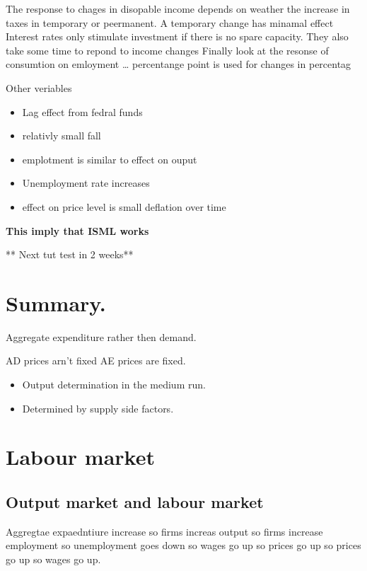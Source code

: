 \documentclass[twocolumn]{article}
\providecommand{\tightlist}{%
  \setlength{\itemsep}{0pt}\setlength{\parskip}{0pt}}
\begin{document}
The response to chages in disopable income depends on weather the
increase in taxes in temporary or peermanent. A temporary change has
minamal effect Interest rates only stimulate investment if there is no
spare capacity. They also take some time to repond to income changes
Finally look at the resonse of consumtion on emloyment \ldots{}
percentange point is used for changes in percentag

Other veriables

\begin{itemize}
\tightlist
\item
  Lag effect from fedral funds
\item
  relativly small fall
\item
  emplotment is similar to effect on ouput
\item
  Unemployment rate increases
\item
  effect on price level is small deflation over time
\end{itemize}

\textbf{This imply that ISML works}

** Next tut test in 2 weeks**

\hypertarget{summary.}{%
\section{Summary.}\label{summary.}}

Aggregate expenditure rather then demand.

AD prices arn't fixed AE prices are fixed.

\begin{itemize}
\tightlist
\item
  Output determination in the medium run.
\item
  Determined by supply side factors.
\end{itemize}

\hypertarget{labour-market}{%
\section{Labour market}\label{labour-market}}

\hypertarget{output-market-and-labour-market}{%
\subsection{Output market and labour
market}\label{output-market-and-labour-market}}

Aggregtae expaedntiure increase so firms increas output so firms
increase employment so unemployment goes down so wages go up so prices
go up so prices go up so wages go up.
\end{document}
